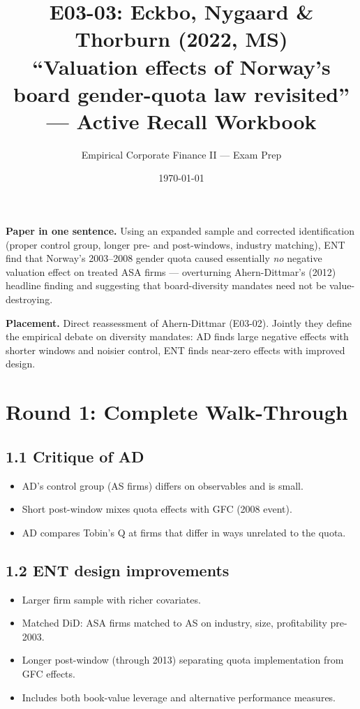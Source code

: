 \documentclass[11pt]{article}
\title{E03-03: Eckbo, Nygaard \& Thorburn (2022, MS) \\
\large ``Valuation effects of Norway's board gender-quota law revisited'' --- Active Recall Workbook}
\author{Empirical Corporate Finance II --- Exam Prep}
\date{\today}
\begin{document}
\maketitle

\begin{keybox}
\textbf{Paper in one sentence.} Using an expanded sample and corrected identification (proper control group, longer pre- and post-windows, industry matching), ENT find that Norway's 2003--2008 gender quota caused essentially \emph{no} negative valuation effect on treated ASA firms --- overturning Ahern-Dittmar's (2012) headline finding and suggesting that board-diversity mandates need not be value-destroying.

\textbf{Placement.} Direct reassessment of Ahern-Dittmar (E03-02). Jointly they define the empirical debate on diversity mandates: AD finds large negative effects with shorter windows and noisier control, ENT finds near-zero effects with improved design.
\end{keybox}

\section*{Round 1: Complete Walk-Through}

\subsection*{1.1 Critique of AD}
\begin{itemize}
\item AD's control group (AS firms) differs on observables and is small.
\item Short post-window mixes quota effects with GFC (2008 event).
\item AD compares Tobin's Q at firms that differ in ways unrelated to the quota.
\end{itemize}

\subsection*{1.2 ENT design improvements}
\begin{itemize}
\item Larger firm sample with richer covariates.
\item Matched DiD: ASA firms matched to AS on industry, size, profitability pre-2003.
\item Longer post-window (through 2013) separating quota implementation from GFC effects.
\item Includes both book-value leverage and alternative performance measures.
\end{itemize}
\end{document}
